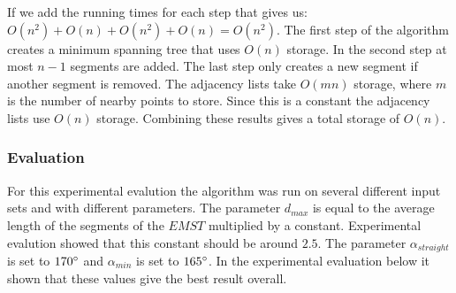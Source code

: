 \documentclass[11pt]{article}
\begin{document}
If we add the running times for each step that gives us: $O(n^2)+O(n)+O(n^2)+O(n)=O(n^2)$. The first step of the algorithm creates a minimum spanning tree that uses $O(n)$ storage. In the second step at most $n-1$ segments are added. The last step only creates a new segment if another segment is removed. The adjacency lists take $O(mn)$ storage, where $m$ is the number of nearby points to store. Since this is a constant the adjacency lists use $O(n)$ storage. Combining these results gives a total storage of $O(n)$.

\subsubsection{Evaluation}
For this experimental evalution the algorithm was run on several different input sets and with different parameters. The parameter $d_{max}$ is equal to the average length of the segments of the $EMST$ multiplied by a constant. Experimental evalution showed that this constant should be around $2.5$. The parameter $\alpha_{straight}$ is set to $170\degree$ and $\alpha_{min}$ is set to $165\degree$. In the experimental evaluation below it shown that these values give the best result overall.
\end{document}
